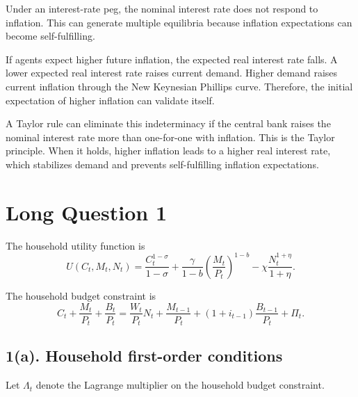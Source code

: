 \documentclass[12pt]{article}
\begin{document}
Under an interest-rate peg, the nominal interest rate does not respond to inflation. This can generate multiple equilibria because inflation expectations can become self-fulfilling.

If agents expect higher future inflation, the expected real interest rate falls. A lower expected real interest rate raises current demand. Higher demand raises current inflation through the New Keynesian Phillips curve. Therefore, the initial expectation of higher inflation can validate itself.

A Taylor rule can eliminate this indeterminacy if the central bank raises the nominal interest rate more than one-for-one with inflation. This is the Taylor principle. When it holds, higher inflation leads to a higher real interest rate, which stabilizes demand and prevents self-fulfilling inflation expectations.












\newpage
\section*{Long Question 1}

The household utility function is
\[
U(C_t,M_t,N_t)
=
\frac{C_t^{1-\sigma}}{1-\sigma}
+
\frac{\gamma}{1-b}
\left(
\frac{M_t}{P_t}
\right)^{1-b}
-
\chi
\frac{N_t^{1+\eta}}{1+\eta}.
\]

The household budget constraint is
\[
C_t+\frac{M_t}{P_t}+\frac{B_t}{P_t}
=
\frac{W_t}{P_t}N_t
+
\frac{M_{t-1}}{P_t}
+
(1+i_{t-1})\frac{B_{t-1}}{P_t}
+
\Pi_t.
\]

\subsection*{1(a). Household first-order conditions}

Let $\Lambda_t$ denote the Lagrange multiplier on the household budget constraint.
\end{document}
